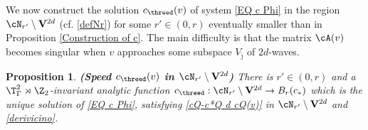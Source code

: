 \documentclass[11pt,a4paper,reqno]{article}
\numberwithin{equation}{section}
\newtheorem{proposition}[theorem]{Proposition}
\theoremstyle{definition}
\begin{document}
We now construct the 
solution $ c_{\threed}(v) $ of system \eqref{EQ c Phi}  
in the region $\cN_{r'}  \setminus {\bf V}^{2d}$ (cf. \eqref{defNr})
for some $ r' \in (0,r)  $ eventually smaller than in Proposition \ref{Construction of c}. 
The main difficulty is that the matrix 
$ \cA (v)$ 
becomes singular when $ v $ approaches 
some subspace $ V_{\hat \jmath} $  
of  $ 2 d$-waves.  

\begin{proposition}\label{c near PJ}{\bf (Speed $c_{\threed}(v)$ 
in $\cN_{r'}\setminus{\bf V}^{2d}$) %
}\label{lem:cJ}
    There is $r'\in (0,r)$ and a $\T^2_\Gamma\rtimes \Z_2$-invariant  analytic function
    $
        c_{\threed} : \cN_{r'}\setminus {\bf V}^{2d} \to B_r(c_*) $ 
 which is the unique solution of \eqref{EQ c Phi}, 
  satisfying \eqref{cQ-c*Q d cQ(v)} 
   in $\cN_{r'}\setminus {\bf V}^{2d}$   and \eqref{derivicino}.  
\end{proposition}
\end{document}
